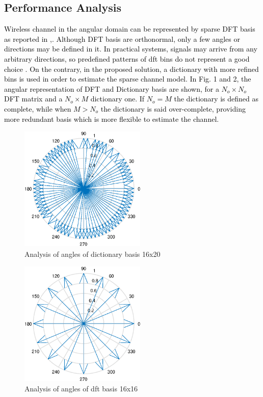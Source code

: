 \subsection{Performance Analysis}
\label{PerfAnalysis}
\textcolor{black}{
Wireless channel in the angular domain can be represented by sparse DFT basis as reported in \cite{review17},\cite{pilot15}. Although DFT basis are orthonormal, only a few angles or directions may be defined in it. In practical systems, signals may arrive from any arbitrary directions, so predefined patterns of dft bins do not represent a good choice \cite{LearningCS15}. On the contrary, in the proposed solution, a dictionary with more refined bins is used in order to estimate the sparse channel model. In Fig. 1 and 2, the angular representation of DFT and Dictionary basis are shown, for a $N_o \times N_o$ DFT matrix and a $N_o \times M$ dictionary one. If $N_o = M$ the dictionary is defined as complete, while when $M>N_o$ the dictionary is said over-complete, providing more redundant basis which is more flexible to estimate the channel.}
\begin{figure}
	\centering
	\includegraphics[width=60mm,height=60mm]{figures/figchap4/dict_angles.eps}
	\caption{Analysis of angles of dictionary basis 16x20}	
	\label{Fig_result1}
\end{figure}
\begin{figure}
	\centering
	\includegraphics[width=60mm,height=60mm]{figures/figchap4/dft_angles.eps}
	\caption{Analysis of angles of dft basis 16x16}	
	\label{Fig_result1}
\end{figure}

